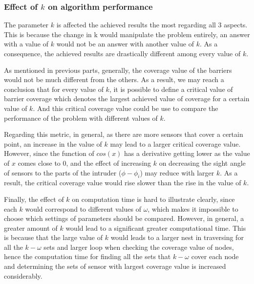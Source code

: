 \subsubsection{Effect of $k$ on algorithm performance}

The parameter $k$ is affected the achieved results the most regarding all 3 aspects. This is because the change in k would manipulate the problem entirely, an answer with a value of $k$ would not be an answer with another value of $k$. As a consequence, the achieved results are drastically different among every value of $k$.

As mentioned in previous parts, generally, the coverage value of the barriers would not be much different from the others. As a result, we may reach a conclusion that for every value of $k$, it is possible to define a critical value of barrier coverage which denotes the largest achieved value of coverage for a certain value of $k$. And this critical coverage value could be use to compare the performance of the problem with different values of $k$.

Regarding this metric, in general, as there are more sensors that cover a certain point, an increase in the value of $k$ may lead to a larger critical coverage value. However, since the function of $cos(x)$ has a derivative getting lower as the value of $x$ comes close to 0, and the effect of increasing $k$ on decreasing the sight angle of sensors to the parts of the intruder ($\phi - \phi_i$) may reduce with larger $k$. As a result, the critical coverage value would rise slower than the rise in the value of $k$.

Finally, the effect of $k$ on computation time is hard to illustrate clearly, since each $k$ would correspond to different values of $\omega$, which makes it impossible to choose which settings of parameters should be compared. However, in general, a greater amount of $k$ would lead to a significant greater computational time. This is because that the large value of $k$ would leads to a larger nest in traversing for all the $k-\omega$ sets and larger loop when checking the coverage value of nodes, hence the computation time for finding all the sets that $k-\omega$ cover each node and determining the sets of sensor with largest coverage value is increased considerably.

